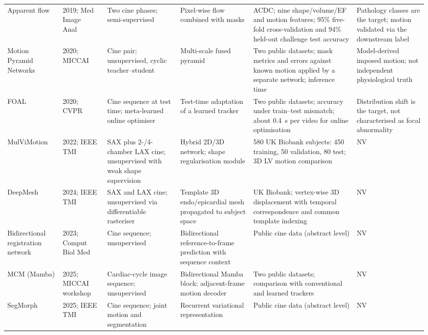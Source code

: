 \documentclass[11pt,a4paper]{article}
\begin{document}
{\begin{longtable}{L{0.11\textwidth}L{0.115\textwidth}L{0.16\textwidth}L{0.185\textwidth}L{0.205\textwidth}L{0.165\textwidth}}
\addlinespace
Apparent flow & 2019; Med Image Anal~\cite{zheng2019apparent} & Two cine phases; semi-supervised & Pixel-wise flow combined with masks & ACDC; nine shape/volume/EF and motion features; 95\% five-fold cross-validation and 94\% held-out challenge test accuracy & Pathology classes are the target; motion validated via the downstream label \\
\addlinespace
Motion Pyramid Networks & 2020; MICCAI~\cite{yu2020mpn} & Cine pair; unsupervised, cyclic teacher--student & Multi-scale fused pyramid & Two public datasets; mask metrics and errors against known motion applied by a separate network; inference time & Model-derived imposed motion; not independent physiological truth \\
\addlinespace
FOAL & 2020; CVPR~\cite{yu2020foal} & Cine sequence at test time; meta-learned online optimiser & Test-time adaptation of a learned tracker & Two public datasets; accuracy under train--test mismatch; about 0.4~s per video for online optimisation & Distribution shift is the target, not characterised as focal abnormality \\
\addlinespace
MulViMotion & 2022; IEEE TMI~\cite{meng2022mulvimotion} & SAX plus 2-/4-chamber LAX cine; unsupervised with weak shape supervision & Hybrid 2D/3D network; shape regularisation module & 580 UK Biobank subjects: 450 training, 50 validation, 80 test; 3D LV motion comparison & NV \\
\addlinespace
DeepMesh & 2024; IEEE TMI~\cite{meng2024deepmesh} & SAX and LAX cine; unsupervised via differentiable rasteriser & Template 3D endo/epicardial mesh propagated to subject space & UK Biobank; vertex-wise 3D displacement with temporal correspondence and common template indexing & NV \\
\addlinespace
Bidirectional registration network & 2023; Comput Biol Med~\cite{lu2023bireg} & Cine sequence; unsupervised & Bidirectional reference-to-frame prediction with sequence context & Public cine data (abstract level) & NV \\
\addlinespace
MCM (Mamba) & 2025; MICCAI work\-shop~\cite{yin2025mcm} & Cardiac-cycle image sequence; unsupervised & Bidirectional Mamba block; adjacent-frame motion decoder & Two public datasets; comparison with conventional and learned trackers & NV \\
\addlinespace
SegMorph & 2025; IEEE TMI~\cite{bi2025segmorph} & Cine sequence; joint motion and segmentation & Recurrent variational representation & Public cine data (abstract level) & NV \\

\end{longtable}}
\end{document}
